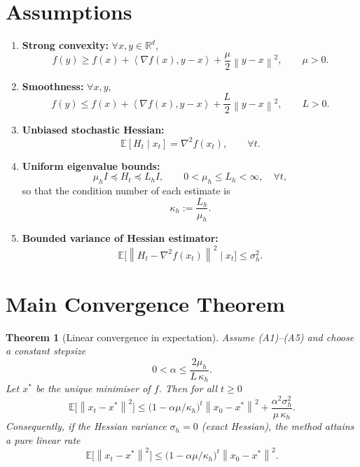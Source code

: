 \documentclass{article}
\newtheorem{theorem}{Theorem}
\newcommand{\E}{\mathbb{E}}
\newcommand{\norm}[1]{\left\|#1\right\|}
\newcommand{\ip}[2]{\left\langle #1,#2\right\rangle}
\begin{document}
\section*{Assumptions}
\begin{enumerate}
\item[(A1)] \textbf{Strong convexity:} $\forall x,y\in\mathbb{R}^{d}$,
\[
f(y)\ge f(x)+\ip{\nabla f(x)}{y-x}+\frac{\mu}{2}\norm{y-x}^{2},
\qquad \mu>0.
\tag{A1}
\]
\item[(A2)] \textbf{Smoothness:} $\forall x,y$,
\[
f(y)\le f(x)+\ip{\nabla f(x)}{y-x}+\frac{L}{2}\norm{y-x}^{2},
\qquad L>0.
\tag{A2}
\]
\item[(A3)] \textbf{Unbiased stochastic Hessian:}
\[
\E[H_{t}\mid x_{t}]=\nabla^{2}f(x_{t}),\qquad\forall t.
\tag{A3}
\]
\item[(A4)] \textbf{Uniform eigenvalue bounds:}
\[
\mu_{h} I \preceq H_{t}\preceq L_{h} I,\qquad
0<\mu_{h}\le L_{h}<\infty,\quad\forall t,
\tag{A4}
\]
so that the condition number of each estimate is
\[
\kappa_{h}:=\frac{L_{h}}{\mu_{h}}.
\]
\item[(A5)] \textbf{Bounded variance of Hessian estimator:}
\[
\E\!\big[\norm{H_{t}-\nabla^{2}f(x_{t})}^{2}\mid x_{t}\big]\le\sigma_{h}^{2}.
\tag{A5}
\]
\end{enumerate}

\section*{Main Convergence Theorem}
\begin{theorem}[Linear convergence in expectation]
Assume (A1)–(A5) and choose a constant stepsize
\[
0<\alpha\le\frac{2\mu_{h}}{L\,\kappa_{h}}.
\]
Let $x^{*}$ be the unique minimiser of $f$. Then for all $t\ge0$
\[
\E\!\big[\norm{x_{t}-x^{*}}^{2}\big]\le\bigl(1-\alpha\mu/\kappa_{h}\bigr)^{t}\norm{x_{0}-x^{*}}^{2}
+\frac{\alpha^{2}\sigma_{h}^{2}}{\mu\,\kappa_{h}}.
\tag{2}
\]
Consequently, if the Hessian variance $\sigma_{h}=0$ (exact Hessian), the method attains a pure linear rate
\[
\E\!\big[\norm{x_{t}-x^{*}}^{2}\big]\le\bigl(1-\alpha\mu/\kappa_{h}\bigr)^{t}\norm{x_{0}-x^{*}}^{2}.
\]
\end{theorem}
\end{document}
